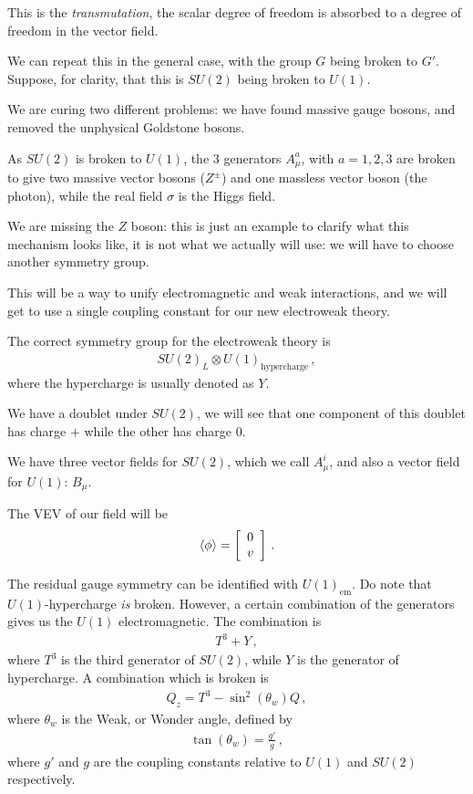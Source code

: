 \documentclass[main.tex]{subfiles}
\begin{document}
This is the \emph{transmutation}, the scalar degree of freedom is absorbed to a degree of freedom in the vector field.

We can repeat this in the general case, with the group \(G\) being broken to \(G'\). Suppose, for clarity, that this is \(SU(2)\) being broken to \(U(1)\). 

We are curing two different problems: we have found massive gauge bosons, and removed the unphysical Goldstone bosons.

As \(SU(2)\) is broken to \(U(1)\), the 3 generators \(A_{\mu }^{a}\), with \(a = 1, 2, 3\) are broken to give two massive vector bosons (\(Z^{\pm}\)) and one massless vector boson (the photon), while the real field \(\sigma \) is the Higgs field.

We are missing the \(Z\) boson: this is just an example to clarify what this mechanism looks like, it is not what we actually will use: we will have to choose another symmetry group.

This will be a way to unify electromagnetic and weak interactions, and we will get to use a single coupling constant for our new electroweak theory.

The correct symmetry group for the electroweak theory is 
%
\begin{align}
SU(2)_{L} \otimes U(1) _{\text{hypercharge}}
\,,
\end{align}
%
where the hypercharge is usually denoted as \(Y\).

We have a doublet under \(SU(2)\), we will see that one component of this doublet has charge \(+\) while the other has charge 0.

We have three vector fields for \(SU(2)\), which we call \(A_{\mu}^{i}\), and also a vector field for \(U(1)\): \(B_{\mu }\).

The VEV of our field will be 
%
\begin{align}
\expval{\phi }= \left[\begin{array}{c}
0 \\ 
v
\end{array}\right]
\,.
\end{align}

The residual gauge symmetry can be identified with \(U(1)_{\text{em}}\). Do note that \(U(1)\)-hypercharge \emph{is} broken. However, a certain combination of the generators gives us the \(U(1)\) electromagnetic.
The combination is 
%
\begin{align}
T^{3} + Y
\,,
\end{align}
%
where \(T^{3}\) is the third generator of \(SU(2)\), while \(Y\) is the generator of hypercharge. 
A combination which is broken is 
%
\begin{align}
Q_{z} = T^{3} - \sin^2 (\theta_{w}) Q
\,,
\end{align}
%
where \(\theta_{w}\) is the Weak, or Wonder angle, defined by 
%
\begin{align}
\tan(\theta_{w}) = \frac{g'}{g}
\,,
\end{align}
%
where \(g'\) and \(g\) are the coupling constants relative to \(U(1)\) and \(SU(2)\) respectively.
\end{document}
